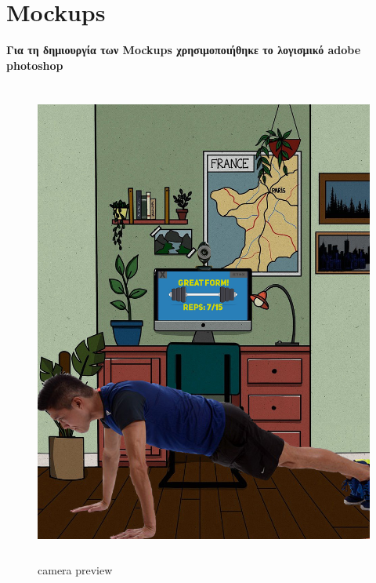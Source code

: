 \section{Mockups}
\textbf{ Για τη δημιουργία των Mockups χρησιμοποιήθηκε το λογισμικό adobe photoshop }
\begin{figure}[!htb]
  \centering
    \centering
    \includegraphics[width=\textwidth,height=16cm]{mockup1.jpg}
    \caption{camera preview}
    \label{}
\end{figure}
